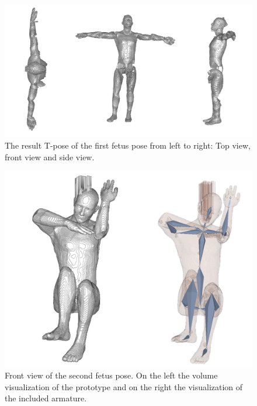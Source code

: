 \vspace*{2cm}

\begin{figure} [htb!]
    \centering
	\includegraphics[width=16cm]{content/images/results/man1Result.png}
	\caption{The result T-pose of the first fetus pose from left to right: Top view, front view and side view.}
	\label{fig:}
\end{figure}
\newpage
\begin{figure} [htb!]
    \centering
	\includegraphics[width=13cm]{content/images/results/man2Front.png}
	\caption{Front view of the second fetus pose. On the left the volume visualization of the prototype and on the right the visualization of the included armature.}
	\label{fig:}
\end{figure}
